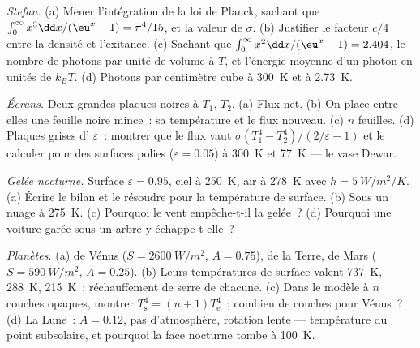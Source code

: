 \begin{exercise}[$\star\star$]\label{exo:b2:thermal-radiation:7}
\emph{Stefan.} (a) Mener l'intégration de la loi de Planck, sachant que
$\int_0^\infty x^3\dd x/(\eu^x - 1) = \pi^4/15$, et la valeur de $\sigma$.
(b) Justifier le facteur $c/4$ entre la densité et l'exitance. (c)
Sachant que $\int_0^\infty x^2\dd x/(\eu^x - 1) = 2.404$, le nombre de photons
par unité de volume à $T$, et l'énergie moyenne d'un photon en unités de $k_BT$.
(d) Photons par centimètre cube à \qty{300}{K} et à \qty{2.73}{K}.
\end{exercise}

\begin{exercise}[$\star\star$]\label{exo:b2:thermal-radiation:8}
\emph{Écrans.} Deux grandes plaques noires à $T_1$, $T_2$. (a) Flux net.
(b) On place entre elles une feuille noire mince~: sa température et le
flux nouveau. (c) $n$ feuilles. (d) Plaques grises d' $\varepsilon$~:
montrer que le flux vaut $\sigma(T_1^4 - T_2^4)/(2/\varepsilon - 1)$ et le calculer
pour des surfaces polies ($\varepsilon = 0.05$) à \qty{300}{K} et
\qty{77}{K} --- le vase Dewar.
\end{exercise}

\begin{exercise}[$\star\star$]\label{exo:b2:thermal-radiation:9}
\emph{Gelée nocturne.} Surface $\varepsilon = 0.95$, ciel à \qty{250}{K}, air à
\qty{278}{K} avec $h = \qty{5}{W/m^2/K}$. (a) Écrire le bilan et le résoudre
pour la température de surface. (b) Sous un nuage à \qty{275}{K}. (c) Pourquoi
le vent empêche-t-il la gelée~? (d) Pourquoi une voiture garée sous un arbre y
échappe-t-elle~?
\end{exercise}

\begin{exercise}[$\star\star\star$]\label{exo:b2:thermal-radiation:10}
\emph{Planètes.} (a)  de Vénus ($S = \qty{2600}{W/m^2}$,
$A = 0.75$), de la Terre, de Mars ($S = \qty{590}{W/m^2}$, $A = 0.25$). (b) Leurs
températures de surface valent \qty{737}{K}, \qty{288}{K}, \qty{215}{K}~:
réchauffement de serre de chacune. (c) Dans le modèle à $n$ couches opaques,
montrer $T_{\text{s}}^4 = (n + 1)T_{\text{e}}^4$~; combien de couches pour Vénus~?
(d) La Lune~: $A = 0.12$, pas d'atmosphère, rotation lente --- température
du point subsolaire, et pourquoi la face nocturne tombe à \qty{100}{K}.
\end{exercise}


